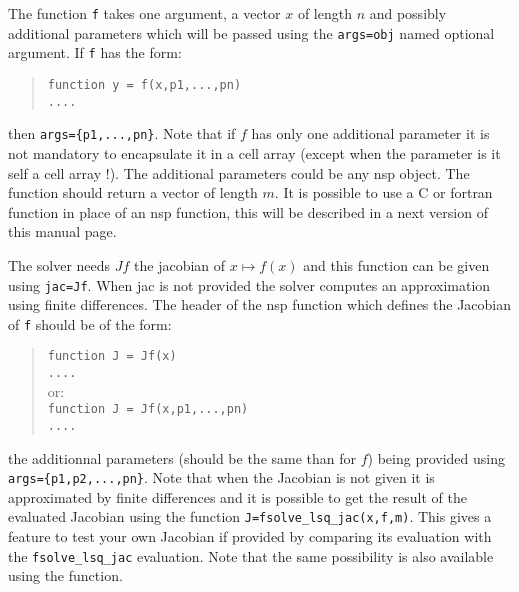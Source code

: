 \begin{mandescription}
The function \verb+f+ takes one argument, a vector $x$ of length $n$ and possibly additional parameters which will be passed using the \verb+args=obj+ named optional argument. If \verb+f+ has the form:
\begin{quote}
{\tt function y = f(x,p1,...,pn) \\
      ....}
\end{quote}
then \verb+args={p1,...,pn}+. Note that if $f$ has only one additional parameter 
it is not mandatory to encapsulate it in a cell array (except when the parameter is it 
self a cell array !). The additional parameters could be any nsp object. 
The function
should return a vector of length $m$. It is possible to use a C or fortran function in place
of an nsp function, this will be described in a next version of this manual page.

The solver needs $Jf$ the jacobian of $x \mapsto f(x)$ and this function can be given using 
\verb+jac=Jf+. When jac is not provided the solver computes an approximation using finite differences. 
The header of the nsp function which defines the Jacobian of \verb+f+ should be of the form:
\begin{quote}
{\tt function J = Jf(x) \\
      ....}\\
or:\\
{\tt function J = Jf(x,p1,...,pn) \\
     ....}
\end{quote}
the additionnal parameters (should be the same than for $f$) being provided using {\tt args=\{p1,p2,...,pn\}}. 
Note that when the Jacobian is not given it is approximated by finite differences and it is 
possible to get the result of the evaluated Jacobian using the function \verb+J=fsolve_lsq_jac(x,f,m)+.
This gives a feature to test your own Jacobian if provided by comparing its evaluation with the 
\verb+fsolve_lsq_jac+ evaluation. Note that the same possibility is also available using the 
 function. 

\end{mandescription} 

